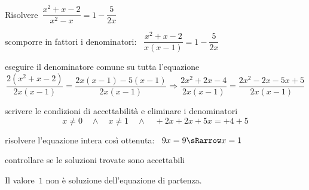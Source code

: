  \begin{esempio}
Risolvere~\(\dfrac{x^{2}+x-2}{x^{2}-x}=1-\dfrac{5}{2x}\)

\begin{enumerate*}
\item scomporre in fattori i denominatori:~
\(\dfrac{x^{2}+x-2}{x(x-1)}=1-\dfrac{5}{2x}\)

\item eseguire il denominatore comune su tutta l'equazione
\[\frac{2(x^{2}+x-2)}{2x(x-1)}=\frac{2x(x-1)-5(x-1)}{2x(x-1)}\Rightarrow
\frac{2x^{2}+2x-4}{2x(x-1)}=\frac{2x^2-2x-5x+5}{2x(x-1)}\]

\item scrivere le condizioni di accettabilità e eliminare i denominatori
\[x \neq 0 \quad \wedge \quad x \neq 1 \quad \wedge \quad 
  +2x +2x +5x = +4 +5\]

\item risolvere l'equazione intera così ottenuta:~
\(9x = 9 \sRarrow x=1\)

\item controllare se le soluzioni trovate sono accettabili

\centering Il valore~\(1\) non è soluzione dell'equazione di partenza.

\end{enumerate*}

 \end{esempio}
 
